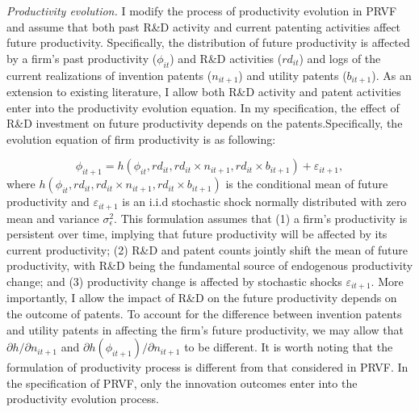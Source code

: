\documentclass[English]{article}
\begin{document}
\textit{Productivity evolution.} I modify the process of productivity evolution in PRVF and assume that both past R\&D activity and current patenting activities affect future productivity. Specifically, the distribution of future productivity is affected by a firm's past productivity ($\phi_{it}$) and R\&D activities ($rd_{it}$) and logs of the current realizations of invention patents ($n_{it+1}$) and utility patents ($b_{it+1}$). As an extension to existing literature, I allow both R\&D activity and patent activities enter into the productivity evolution equation. In my specification, the effect of R\&D investment on future productivity depends on the patents.Specifically, the evolution equation of firm productivity is as
following:

\begin{equation}
    \phi_{it+1} = h(\phi_{it}, rd_{it}, rd_{it}\times n_{it+1}, rd_{it}\times b_{it+1}) + \varepsilon_{it+1},
\end{equation}
where $h(\phi_{it}, rd_{it}, rd_{it}\times n_{it+1}, rd_{it}\times b_{it+1})$ is the conditional mean of future productivity and $\varepsilon_{it+1}$ is an i.i.d stochastic shock normally distributed with zero mean and variance $\sigma_{\epsilon}^2$. This
formulation assumes that (1) a firm's productivity is persistent over time, implying that future productivity will be affected by its current productivity; (2) R\&D and patent counts jointly shift the mean of future productivity, with R\&D being the fundamental source of endogenous productivity change; and (3) productivity change is affected by stochastic shocks $\varepsilon_{it+1}$. More importantly, I allow the impact of R\&D on the future productivity depends on the outcome of patents. To account for the difference between invention patents
and utility patents in affecting the firm's future productivity, we may allow that $\partial h/\partial n_{it+1}$ and $\partial h(\phi_{it+1})/\partial n_{it+1}$ to be different. It is worth noting that the formulation of productivity process is different from that considered in PRVF. In the specification of PRVF, only the innovation outcomes enter into the productivity evolution process. 
\end{document}
